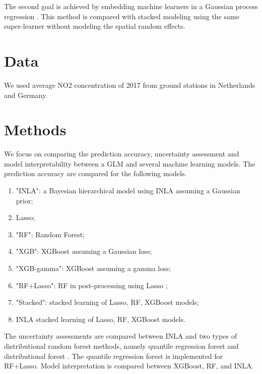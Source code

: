 \documentclass{article}
\begin{document}
The second goal is achieved by embedding machine learners in a Gaussian process regression \citep{stackinla}. This method is compared with stacked modeling using  the same super-learner without modeling the spatial random effects. 

 
 
\section{Data}
We used average NO2 concentration of 2017 from ground stations in Netherlands and Germany.

\section {Methods}
 
We focus on comparing the prediction accuracy, uncertainty assessment and model interpretability between a GLM and several machine learning models. The prediction accuracy are compared for the following models.   
\begin{enumerate}
    
\item "INLA": a Bayesian hierarchical model using INLA  assuming a Gaussian prior;
\item Lasso; 
\item "RF": Random Forest; 
\item "XGB": XGBoost assuming a Gaussian loss; 
\item "XGB-gamma": XGBoost assuming a gamma loss; 
\item "RF+Lasso": RF in post-processing using Lasso \citep{hastie2009elements}; 
\item "Stacked": stacked learning of Lasso, RF, XGBoost models; 
\item INLA stacked learning of Lasso, RF, XGBoost models. 
\end{enumerate}

The uncertainty assessments are compared between INLA and two types of distributional random forest methods, namely quantile regression forest \citep{meinshausen2006quantile} and distributional forest \citep{schlosser2019distributional}. The quantile regression forest is implemented for RF+Lasso.  %
Model interpretation is compared between XGBoost, RF, and INLA.
\end{document}
